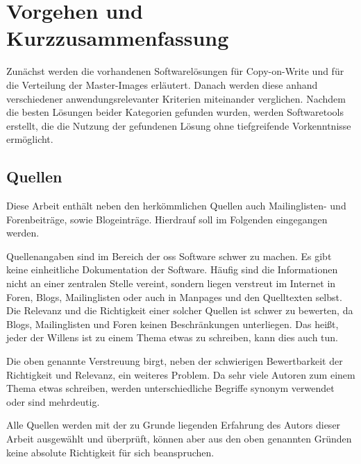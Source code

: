\section{Vorgehen und Kurzzusammenfassung} 

Zunächst werden die vorhandenen Softwarelösungen für Copy-on-Write und für die Verteilung der Master-Images erläutert. Danach werden diese anhand verschiedener anwendungsrelevanter Kriterien miteinander verglichen. Nachdem die besten Lösungen beider Kategorien gefunden wurden, werden Softwaretools erstellt, die die Nutzung der gefundenen Lösung ohne tiefgreifende Vorkenntnisse ermöglicht.

\subsection{Quellen}
Diese Arbeit enthält neben den herkömmlichen Quellen auch Mailinglisten- und Forenbeiträge, sowie Blogeinträge. Hierdrauf soll im Folgenden eingegangen werden.

Quellenangaben sind im Bereich der \gls{oss} Software schwer zu machen. Es gibt keine einheitliche Dokumentation der Software. Häufig sind die Informationen nicht an einer zentralen Stelle vereint, sondern liegen verstreut im Internet in Foren, Blogs, Mailinglisten oder auch in Manpages und den Quelltexten selbst. Die Relevanz und die Richtigkeit einer solcher Quellen ist schwer zu bewerten, da Blogs, Mailinglisten und Foren keinen Beschränkungen unterliegen. Das heißt, jeder der Willens ist zu einem Thema etwas zu schreiben, kann dies auch tun.

Die oben genannte Verstreuung birgt, neben der schwierigen Bewertbarkeit der Richtigkeit und Relevanz, ein weiteres Problem. Da sehr viele Autoren zum einem Thema etwas schreiben, werden unterschiedliche Begriffe synonym verwendet oder sind mehrdeutig.

Alle Quellen werden mit der zu Grunde liegenden Erfahrung des Autors dieser Arbeit ausgewählt und überprüft, können aber aus den oben genannten Gründen keine absolute Richtigkeit für sich beanspruchen.
